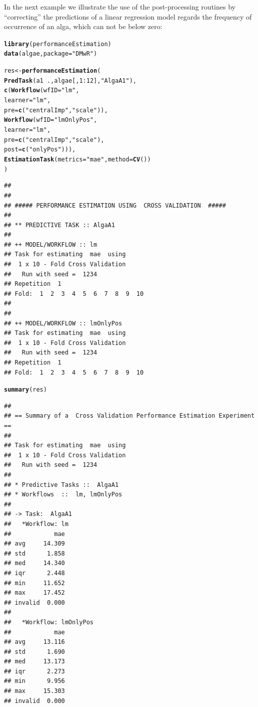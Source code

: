 \documentclass[10pt,a4paper]{article}\usepackage[]{graphicx}\usepackage[]{color}
\makeatletter
\newcommand{\hlnum}[1]{\textcolor[rgb]{0.686,0.059,0.569}{#1}}%
\newcommand{\hlstr}[1]{\textcolor[rgb]{0.192,0.494,0.8}{#1}}%
\newcommand{\hlopt}[1]{\textcolor[rgb]{0,0,0}{#1}}%
\newcommand{\hlstd}[1]{\textcolor[rgb]{0.345,0.345,0.345}{#1}}%
\newcommand{\hlkwb}[1]{\textcolor[rgb]{0.69,0.353,0.396}{#1}}%
\newcommand{\hlkwc}[1]{\textcolor[rgb]{0.333,0.667,0.333}{#1}}%
\newcommand{\hlkwd}[1]{\textcolor[rgb]{0.737,0.353,0.396}{\textbf{#1}}}%
\newenvironment{kframe}{%
 \def\at@end@of@kframe{}%
 \ifinner\ifhmode%
  \def\at@end@of@kframe{\end{minipage}}%
  \begin{minipage}{\columnwidth}%
 \fi\fi%
 \def\FrameCommand##1{\hskip\@totalleftmargin \hskip-\fboxsep
 \colorbox{shadecolor}{##1}\hskip-\fboxsep
     \hskip-\linewidth \hskip-\@totalleftmargin \hskip\columnwidth}%
 \MakeFramed {\advance\hsize-\width
   \@totalleftmargin\z@ \linewidth\hsize
   \@setminipage}}%
 {\par\unskip\endMakeFramed%
 \at@end@of@kframe}
\newenvironment{knitrout}{}{} %
\makeatother
\begin{document}
In the next example we illustrate the use of the post-processing routines by ``correcting'' the predictions of a linear regression model regards the frequency of occurrence of an alga, which can not be below zero:

\begin{knitrout}\footnotesize
{}\color{fgcolor}\begin{kframe}
\begin{alltt}
\hlkwd{library}\hlstd{(performanceEstimation)}
\hlkwd{data}\hlstd{(algae,}\hlkwc{package}\hlstd{=}\hlstr{"DMwR"}\hlstd{)}

\hlstd{res} \hlkwb{<-} \hlkwd{performanceEstimation}\hlstd{(}
         \hlkwd{PredTask}\hlstd{(a1} \hlopt{~} \hlstd{.,algae[,}\hlnum{1}\hlopt{:}\hlnum{12}\hlstd{],}\hlstr{"AlgaA1"}\hlstd{),}
         \hlkwd{c}\hlstd{(}\hlkwd{Workflow}\hlstd{(}\hlkwc{wfID}\hlstd{=}\hlstr{"lm"}\hlstd{,}
                    \hlkwc{learner}\hlstd{=}\hlstr{"lm"}\hlstd{,}
                    \hlkwc{pre}\hlstd{=}\hlkwd{c}\hlstd{(}\hlstr{"centralImp"}\hlstd{,}\hlstr{"scale"}\hlstd{)),}
           \hlkwd{Workflow}\hlstd{(}\hlkwc{wfID}\hlstd{=}\hlstr{"lmOnlyPos"}\hlstd{,}
                    \hlkwc{learner}\hlstd{=}\hlstr{"lm"}\hlstd{,}
                    \hlkwc{pre}\hlstd{=}\hlkwd{c}\hlstd{(}\hlstr{"centralImp"}\hlstd{,}\hlstr{"scale"}\hlstd{),}
                    \hlkwc{post}\hlstd{=}\hlkwd{c}\hlstd{(}\hlstr{"onlyPos"}\hlstd{))),}
         \hlkwd{EstimationTask}\hlstd{(}\hlkwc{metrics}\hlstd{=}\hlstr{"mae"}\hlstd{,}\hlkwc{method}\hlstd{=}\hlkwd{CV}\hlstd{())}
         \hlstd{)}
\end{alltt}
\begin{verbatim}
## 
## 
## ##### PERFORMANCE ESTIMATION USING  CROSS VALIDATION  #####
## 
## ** PREDICTIVE TASK :: AlgaA1
## 
## ++ MODEL/WORKFLOW :: lm 
## Task for estimating  mae  using
##  1 x 10 - Fold Cross Validation
## 	 Run with seed =  1234 
## Repetition  1 
## Fold:  1  2  3  4  5  6  7  8  9  10
## 
## 
## ++ MODEL/WORKFLOW :: lmOnlyPos 
## Task for estimating  mae  using
##  1 x 10 - Fold Cross Validation
## 	 Run with seed =  1234 
## Repetition  1 
## Fold:  1  2  3  4  5  6  7  8  9  10
\end{verbatim}
\begin{alltt}
\hlkwd{summary}\hlstd{(res)}
\end{alltt}
\begin{verbatim}
## 
## == Summary of a  Cross Validation Performance Estimation Experiment ==
## 
## Task for estimating  mae  using
##  1 x 10 - Fold Cross Validation
## 	 Run with seed =  1234 
## 
## * Predictive Tasks ::  AlgaA1
## * Workflows  ::  lm, lmOnlyPos 
## 
## -> Task:  AlgaA1
##   *Workflow: lm 
##            mae
## avg     14.309
## std      1.858
## med     14.340
## iqr      2.448
## min     11.652
## max     17.452
## invalid  0.000
## 
##   *Workflow: lmOnlyPos 
##            mae
## avg     13.116
## std      1.690
## med     13.173
## iqr      2.273
## min      9.956
## max     15.303
## invalid  0.000
\end{verbatim}
\end{kframe}
\end{knitrout}
\end{document}
